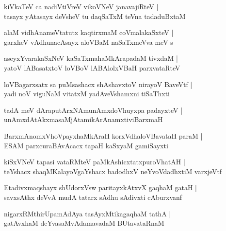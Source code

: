 \documentclass[twoside,12pt,openright]{book}
\newcounter{shloka}[chapter]
\begin{document}
\begin{shloka}%
kiVkaTeV ca nadiVtiVreV vikoVNeV janavajiRteV |\\
tasayx yAtasayx deVsheV tu daqSaTxM teVna tadaduBxtaM 
\end{shloka}

\begin{shloka}%
alaM vidhAnameVtatutx kaqtirxmaM coVmalakaSxteV |\\
garxheV vAdhunacAsayx aloVBaM naSaTxmeVva meV s
\end{shloka}

\begin{shloka}%
aseyxYvarakaSxNeV kaSaTxmahaMkArapadaM tivxdaM |\\
yatoV lABasatxtoV loVBoV lABAlolxVBaH parxvataRteV
\end{shloka}

\begin{shloka}%
loVBagarxsatx sa puMsashacx shAshavxtoV nirayoV BaveVtf |\\
yadi noV viguNaM vitatxM yadAveVshamxni tiSaThxti 
\end{shloka}

\begin{shloka}%
tadA meV dAraputArxNAmunAmxdoVhuyxpa padayxteV |\\
unAmxdAtAkxmasaMjAtamikArAnamxtiviBarxmaH 
\end{shloka}

\begin{shloka}%
BarxmAnomxVhoVpayxhaMkAraH korxVdhaloVBavataH paraM |\\
ESAM parxcuraBAvAcacx tapaH kaSxyaM gamiSayxti 
\end{shloka}

\begin{shloka}%
kiSxVNeV tapasi vataRMteV paMkAshicxtatxpuroVhatAH |\\
teYshacx shaqMKalayoVgaYshacx badodhxV neYvoVdadhxtiM varxjeVtf 
\end{shloka}

\begin{shloka}%
Etadivxmaqshayx  shUdorxVsw paritayxkAtxvX gaqhaM gataH |\\
savxsAthx deVvA mudA tatarx sAdhu sAdivxti cAburxvanf
\end{shloka}

\begin{shloka}%
nigarxRMthirUpamAdAya tasAyxMtikagaqhaM tathA |\\
gatAvxhaM deYvasaMvAdamavadaM BUtavataRnaM 
\end{shloka}
\end{document}
